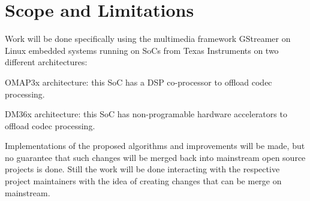 \section{Scope and Limitations}
\begin{itemize*}
\item Work will be done specifically using the multimedia framework GStreamer on Linux embedded systems running on \acp{SoC} from Texas Instruments on two different architectures:
	\begin{itemize*}
	\item OMAP3x architecture: this \ac{SoC} has a \ac{DSP} co-processor to offload codec processing.
	\item DM36x architecture: this \ac{SoC} has non-programable hardware accelerators to offload codec processing.
	\end{itemize*}
\item Implementations of the proposed algorithms and improvements will be made, but no guarantee that such changes will be merged back into mainstream open source projects is done. Still the work will be done interacting with the respective project maintainers with the idea of creating changes that can be merge on mainstream.
\end{itemize*}
 